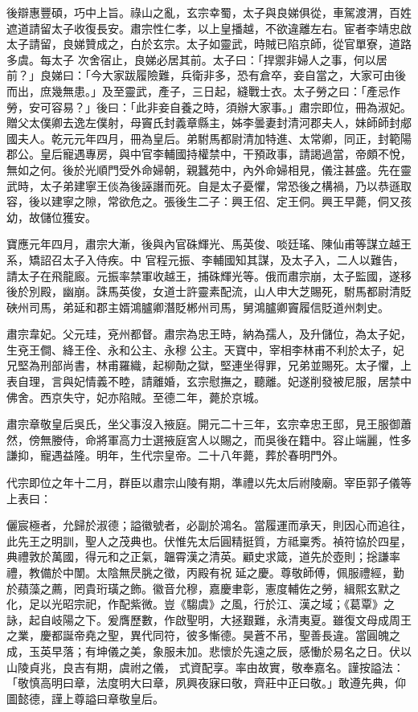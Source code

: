 \begin{pinyinscope}
 後辯惠豐碩，巧中上旨。祿山之亂，玄宗幸蜀，太子與良娣俱從，車駕渡渭，百姓遮道請留太子收復長安。肅宗性仁孝，以上皇播越，不欲違離左右。宦者李靖忠啟太子請留，良娣贊成之，白於玄宗。太子如靈武，時賊已陷京師，從官單寮，道路多虞。每太子
 次舍宿止，良娣必居其前。太子曰：「捍禦非婦人之事，何以居前？」良娣曰：「今大家跋履險難，兵衛非多，恐有倉卒，妾自當之，大家可由後而出，庶幾無患。」及至靈武，產子，三日起，縫戰士衣。太子勞之曰：「產忌作勞，安可容易？」後曰：「此非妾自養之時，須辦大家事。」肅宗即位，冊為淑妃。贈父太僕卿去逸左僕射，母竇氏封義章縣主，姊李曇妻封清河郡夫人，妹師師封郕國夫人。乾元元年四月，冊為皇后。弟駙馬都尉清加特進、太常卿，同正，封範陽
 郡公。皇后寵遇專房，與中官李輔國持權禁中，干預政事，請謁過當，帝頗不悅，無如之何。後於光順門受外命婦朝，親蠶苑中，內外命婦相見，儀注甚盛。先在靈武時，太子弟建寧王倓為後誣譖而死。自是太子憂懼，常恐後之構禍，乃以恭遜取容，後以建寧之隙，常欲危之。張後生二子：興王佋、定王侗。興王早薨，侗又孩幼，故儲位獲安。



 寶應元年四月，肅宗大漸，後與內官硃輝光、馬英俊、啖廷瑤、陳仙甫等謀立越王系，矯詔召太子入侍疾。中
 官程元振、李輔國知其謀，及太子入，二人以難告，請太子在飛龍廄。元振率禁軍收越王，捕硃輝光等。俄而肅宗崩，太子監國，遂移後於別殿，幽崩。誅馬英俊，女道士許靈素配流，山人申大芝賜死，駙馬都尉清貶硤州司馬，弟延和郡主婿鴻臚卿潛貶郴州司馬，舅鴻臚卿竇履信貶道州刺史。



 肅宗韋妃。父元珪，兗州都督。肅宗為忠王時，納為孺人，及升儲位，為太子妃，生兗王僴、絳王佺、永和公主、永穆
 公主。天寶中，宰相李林甫不利於太子，妃兄堅為刑部尚書，林甫羅織，起柳勣之獄，堅連坐得罪，兄弟並賜死。太子懼，上表自理，言與妃情義不睦，請離婚，玄宗慰撫之，聽離。妃遂削發被尼服，居禁中佛舍。西京失守，妃亦陷賊。至德二年，薨於京城。



 肅宗章敬皇后吳氏，坐父事沒入掖庭。開元二十三年，玄宗幸忠王邸，見王服御蕭然，傍無媵侍，命將軍高力士選掖庭宮人以賜之，而吳後在籍中。容止端麗，性多
 謙抑，寵遇益隆。明年，生代宗皇帝。二十八年薨，葬於春明門外。



 代宗即位之年十二月，群臣以肅宗山陵有期，準禮以先太后祔陵廟。宰臣郭子儀等上表曰：



 儷宸極者，允歸於淑德；謚徽號者，必副於鴻名。當履運而承天，則因心而追往，此先王之明訓，聖人之茂典也。伏惟先太后圓精挺質，方祗稟秀。禎符協於四星，典禮敦於萬國，得元和之正氣，韞霄漢之清英。顧史求箴，道先於壺則；捴謙率禮，教備於中闈。太陰無昃朓之徵，丙殿有祝
 延之慶。尊敬師傅，佩服禮經，勤於蘋藻之薦，罔貴珩璜之飾。徽音允穆，嘉慶聿彰，憲度輔佐之勞，緝熙玄默之化，足以光昭宗祀，作配紫微。豈《騶虞》之風，行於江、漢之域；《葛覃》之詠，起自岐陽之下。爰膺歷數，作啟聖明，大拯艱難，永清夷夏。雖復文母成周王之業，慶都誕帝堯之聖，異代同符，彼多慚德。昊蒼不吊，聖善長違。當圓魄之成，玉英早落；有坤儀之美，象服未加。悲懷於先遠之辰，感慟於易名之日。伏以山陵貞兆，良吉有期，虞祔之儀，
 式資配享。率由故實，敬奉嘉名。謹按謚法：「敬慎高明曰章，法度明大曰章，夙興夜寐曰敬，齊莊中正曰敬。」敢遵先典，仰圖懿德，謹上尊謚曰章敬皇后。




\end{pinyinscope}

